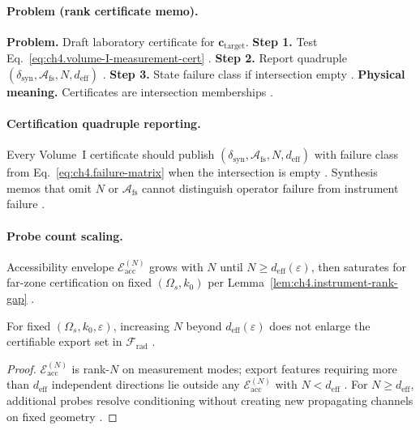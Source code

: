 \paragraph{Problem (rank certificate memo).}
\textbf{Problem.} Draft laboratory certificate for \(\mathbf{c}_{\mathrm{target}}\).
\textbf{Step 1.} Test Eq.~\eqref{eq:ch4.volume-I-measurement-cert} \cite{harrington2001,stratton1941}.
\textbf{Step 2.} Report quadruple \((\delta_{\mathrm{syn}},\mathcal{A}_{\mathrm{fs}},N,d_{\mathrm{eff}})\) \cite{hansen1988,devaney2004}.
\textbf{Step 3.} State failure class if intersection empty \cite{jackson1999,collin2001}.
\textbf{Physical meaning.} Certificates are intersection memberships \cite{harrington2001}.

\paragraph{Certification quadruple reporting.}
Every Volume~I certificate should publish \((\delta_{\mathrm{syn}},\mathcal{A}_{\mathrm{fs}},N,d_{\mathrm{eff}})\) with failure class from
Eq.~\eqref{eq:ch4.failure-matrix} when the intersection is empty \cite{stratton1941,harrington2001,hansen1988,devaney2004,jackson1999,collin2001}.
Synthesis memos that omit \(N\) or \(\mathcal{A}_{\mathrm{fs}}\) cannot distinguish operator failure from instrument failure \cite{harrington2001,devaney2004}.

\paragraph{Probe count scaling.}
Accessibility envelope \(\mathcal{E}_{\mathrm{acc}}^{(N)}\) grows with \(N\) until \(N\ge d_{\mathrm{eff}}(\varepsilon)\), then saturates for far-zone
certification on fixed \((\Omega_{s},k_{0})\) per Lemma~\ref{lem:ch4.instrument-rank-gap} \cite{harrington2001,hansen1988,stratton1941,devaney2004,jackson1999}.

\begin{theorem}
\label{thm:ch4.probe-cert-saturation}
For fixed \((\Omega_{s},k_{0},\varepsilon)\), increasing \(N\) beyond \(d_{\mathrm{eff}}(\varepsilon)\) does not enlarge the certifiable export set in
\(\mathcal{F}_{\mathrm{rad}}\) \cite{harrington2001,devaney2004,hansen1988,stratton1941,jackson1999}.
\end{theorem}
\begin{proof}
\(\mathcal{E}_{\mathrm{acc}}^{(N)}\) is rank-\(N\) on measurement modes; export features requiring more than \(d_{\mathrm{eff}}\) independent directions lie
outside any \(\mathcal{E}_{\mathrm{acc}}^{(N)}\) with \(N<d_{\mathrm{eff}}\) \cite{harrington2001,stratton1941}. For \(N\ge d_{\mathrm{eff}}\), additional probes
resolve conditioning without creating new propagating channels on fixed geometry \cite{devaney2004,hansen1988,jackson1999,collin2001}.
\end{proof}

